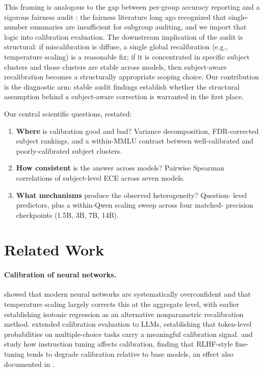 \documentclass[11pt]{article}
\begin{document}
This framing is analogous to the gap between per-group accuracy reporting and a
rigorous fairness audit \citep{barocas2023fairness}: the fairness literature long
ago recognized that single-number summaries are insufficient for subgroup
auditing, and we import that logic into calibration evaluation. The downstream
implication of the audit is structural: if miscalibration is diffuse, a single
global recalibration (e.g., temperature scaling) is a reasonable fix; if it is
concentrated in specific subject clusters and those clusters are stable across
models, then subject-aware recalibration becomes a structurally appropriate
scoping choice. Our contribution is the diagnostic arm: stable
audit findings establish whether the structural assumption behind a subject-aware
correction is warranted in the first place.

Our central scientific questions, restated:
\begin{enumerate}
  \item \textbf{Where} is calibration good and bad? Variance decomposition,
    FDR-corrected subject rankings, and a within-MMLU contrast between
    well-calibrated and poorly-calibrated subject clusters.
  \item \textbf{How consistent} is the answer across models? Pairwise
    Spearman correlations of subject-level ECE across seven models.
  \item \textbf{What mechanisms} produce the observed heterogeneity? Question-
    level predictors, plus a within-Qwen scaling sweep across four matched-
    precision checkpoints (1.5B, 3B, 7B, 14B).
\end{enumerate}

\section{Related Work}
\label{sec:relwork}

\paragraph{Calibration of neural networks.}
\citet{guo2017calibration} showed that modern neural networks are systematically
overconfident and that temperature scaling largely corrects this at the aggregate level,
with \citet{zadrozny2002transforming} earlier establishing isotonic regression as an
alternative nonparametric recalibration method. \citet{kadavath2022language} extended
calibration evaluation to LLMs, establishing that token-level probabilities on
multiple-choice tasks carry a meaningful calibration signal. \citet{nakkiran2025trained}
and \citet{yaldiz2026balancing} study how instruction tuning affects calibration, finding
that RLHF-style fine-tuning tends to degrade calibration relative to base models, an
effect also documented in \citet{ouyang2022training}.
\end{document}
